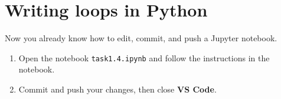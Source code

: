 \documentclass[12pt,a4paper]{article}
\begin{document}
\section{Writing loops in Python}
Now you already know how to edit, commit, and push a Jupyter notebook.
\begin{enumerate}
    \item Open the notebook \texttt{task1.4.ipynb} and follow the instructions in the notebook.
    \item Commit and push your changes, then close \textbf{VS Code}.
\end{enumerate}
\end{document}
